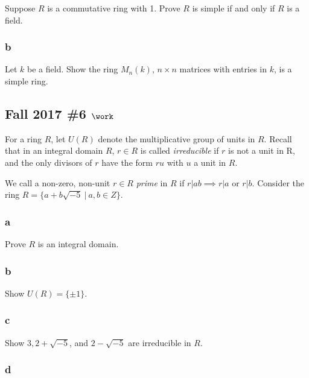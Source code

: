 Suppose \(R\) is a commutative ring with 1. Prove \(R\) is simple if and
only if \(R\) is a field.

\hypertarget{b-30}{%
\subsubsection{b}\label{b-30}}

Let \(k\) be a field. Show the ring \(M_n (k)\), \(n \times n\) matrices
with entries in \(k\), is a simple ring.

\hypertarget{fall-2017-6-work}{%
\subsection{\texorpdfstring{Fall 2017 \#6
\(\work\)}{Fall 2017 \#6 \textbackslash work}}\label{fall-2017-6-work}}

For a ring \(R\), let \(U(R)\) denote the multiplicative group of units
in \(R\). Recall that in an integral domain \(R\), \(r \in R\) is called
\emph{irreducible} if \(r\) is not a unit in R, and the only divisors of
\(r\) have the form \(ru\) with \(u\) a unit in \(R\).

We call a non-zero, non-unit \(r \in R\) \emph{prime} in \(R\) if
\(r \mathrel{\Big|}ab \implies r \mathrel{\Big|}a\) or
\(r \mathrel{\Big|}b\). Consider the ring
\(R = \{a + b \sqrt{-5}{~\mathrel{\Big|}~}a, b \in Z\}\).

\hypertarget{a-41}{%
\subsubsection{a}\label{a-41}}

Prove \(R\) is an integral domain.

\hypertarget{b-31}{%
\subsubsection{b}\label{b-31}}

Show \(U(R) = \{\pm1\}\).

\hypertarget{c-23}{%
\subsubsection{c}\label{c-23}}

Show \(3, 2 + \sqrt{-5}\), and \(2 - \sqrt{-5}\) are irreducible in
\(R\).

\hypertarget{d-9}{%
\subsubsection{d}\label{d-9}}


